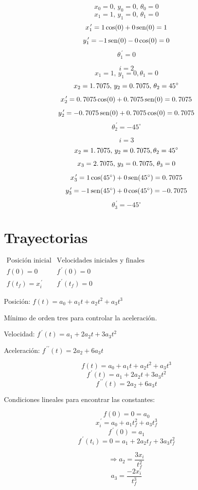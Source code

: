 $$x_{0} = 0,\, y_{0} = 0,\, \theta_{0} = 0$$
$$x_{1} = 1,\, y_{1} = 0,\, \theta_{1} = 0$$
$$x_{1}^{\,\prime} = 1 \cos (0) + 0\mathop{\rm sen}\nolimits (0) = 1$$
$$y_{1}^{\,\prime} = - 1 \mathop{\rm sen}\nolimits (0) - 0\cos (0) = 0$$
$$\theta_{1}^{\,\prime} = 0$$

$$i = 2$$
$$x_{1} = 1, \, y_{1} = 0, \theta_{1} = 0$$
$$x_{2} = 1\ldotp7075,\, y_{2} = 0\ldotp7075,\, \theta_{2} = 45^\circ$$
$$x_{2}^{\,\prime} = 0\ldotp7075 \cos (0) + 0\ldotp7075\mathop{\rm sen}\nolimits (0) = 0\ldotp7075$$
$$y_{2}^{\,\prime} = - 0\ldotp7075 \mathop{\rm sen}\nolimits (0) + 0\ldotp7075\cos (0) = 0\ldotp7075$$
$$\theta_{2}^{\,\prime} = -45^\circ$$

$$i = 3$$
$$x_{2} = 1\ldotp7075, \, y_{2} = 0\ldotp7075, \theta_{2} = 45^\circ$$
$$x_{3} = 2\ldotp7075,\, y_{3} = 0\ldotp7075,\, \theta_{3} = 0$$
$$x_{3}^{\,\prime} = 1 \cos (45^\circ) + 0\mathop{\rm sen}\nolimits (45^\circ) = 0\ldotp7075$$
$$y_{3}^{\,\prime} = - 1 \mathop{\rm sen}\nolimits (45^\circ) + 0 \cos (45^\circ) = -0\ldotp7075$$
$$\theta_{3}^{\,\prime} = -45^\circ$$



\section{Trayectorias}

$
\begin{array}{cc}
	\mbox{Posición inicial} & \mbox{Velocidades iniciales y finales} \\
	f(0) = 0                & f^{\,\prime}(0) = 0 \\
	f(t_{f}) = x_{i}^{\,\prime} & f^{\,\prime} (t_{f}) = 0 
\end{array}
$

Posición: $f(t) = a_{0} + a_{1}t + a_{2}t^{2} + a_{3}t^{3}$

Mínimo de orden tres para controlar la aceleración.

Velocidad: $f^{\,\prime} (t) = a_{1} + 2a_{2}t + 3a_{3}t^2$

Aceleración: $f^{\,\prime\prime} (t) = 2a_{2} + 6a_{3}t$

$$f(t) = a_{0} + a_{1}t + a_{2}t^{2} + a_{3}t^{3}$$
$$f^{\,\prime} (t) = a_{1} + 2a_{2}t + 3a_{3}t^2$$
$$f^{\,\prime\prime} (t) = 2a_{2} + 6a_{3}t$$

Condiciones lineales para encontrar las constantes:

$$f(0) = 0 = a_{0}$$
$$x_{i}^{\,\prime} = a_{0} + a_{1}t_{f}^{2} + a_{3}t_{f}^{3}$$
$$f^{\,\prime}(0) = a_{1}$$
$$f^{\,\prime}(t_{i}) = 0 = a_{1} + 2a_{2}t_{f} + 3a_{3}t_{f}^{2}$$

$$\Rightarrow a_{2} = \dfrac{3x_{i}}{t_{f}^{2}}$$
$$a_{3} = \dfrac{-2x_{i}}{t_{f}^{3}}$$
	
